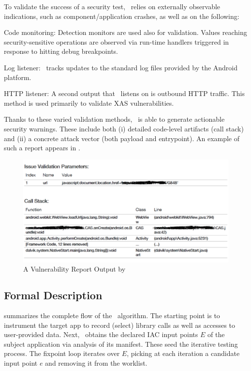 To validate the success of a security test, \Tool\ relies on externally observable indications, such as component/application crashes, as well as on the following: 
\begin{compactenum}
	\item Code monitoring: Detection monitors are used also for validation.
	Values reaching security-sensitive operations are observed via run-time handlers 
	triggered in response to hitting debug breakpoints.
	\item Log listener: \Tool\ tracks updates to the standard log files provided by the Android platform. 
	\item HTTP listener: A second output that \Tool\ listens on is outbound HTTP traffic. This method is used primarily to validate XAS vulnerabilities.
\end{compactenum} 
Thanks to these varied validation methods, \Tool\ is able to generate actionable security warnings. These include both (i) detailed code-level artifacts (call stack) and (ii) a concrete attack vector (both payload and entrypoint). An example of such a report appears in .

\begin{figure}
	\includegraphics[width=\columnwidth]{screenshot.pdf}
	\caption{\label{Fi:screenshot}A Vulnerability Report Output by \Tool}
\end{figure} 

\subsection{Formal Description}

 summarizes the complete flow of the \Tool\ algorithm. The starting point is to instrument the target app to record (select) library calls as well as accesses to user-provided data. Next, \Tool\ obtains the declared IAC input points $E$ of the subject application via analysis of its manifest. These seed the iterative testing process. The fixpoint loop iterates over $E$, picking at each iteration a candidate input point $e$ and removing it from the worklist.

